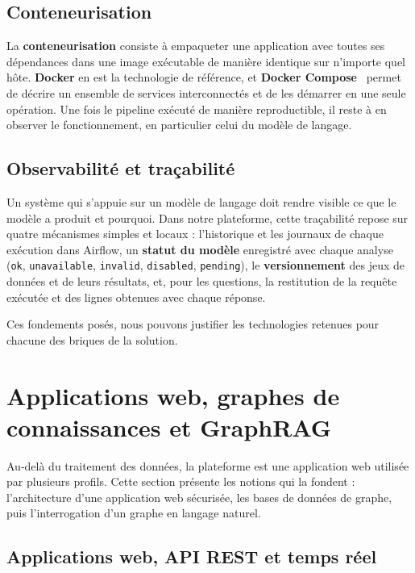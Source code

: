 \subsection{Conteneurisation}

La \textbf{conteneurisation} consiste à empaqueter une application avec toutes ses dépendances dans une image exécutable de manière identique sur n'importe quel hôte. \textbf{Docker} en est la technologie de référence, et \textbf{Docker Compose}~\cite{docker} permet de décrire un ensemble de services interconnectés et de les démarrer en une seule opération. Une fois le pipeline exécuté de manière reproductible, il reste à en observer le fonctionnement, en particulier celui du modèle de langage.

\subsection{Observabilité et traçabilité}

Un système qui s'appuie sur un modèle de langage doit rendre visible ce que le modèle a produit et pourquoi. Dans notre plateforme, cette traçabilité repose sur quatre mécanismes simples et locaux : l'historique et les journaux de chaque exécution dans Airflow, un \textbf{statut du modèle} enregistré avec chaque analyse (\texttt{ok}, \texttt{unavailable}, \texttt{invalid}, \texttt{disabled}, \texttt{pending}), le \textbf{versionnement} des jeux de données et de leurs résultats, et, pour les questions, la restitution de la requête exécutée et des lignes obtenues avec chaque réponse.

Ces fondements posés, nous pouvons justifier les technologies retenues pour chacune des briques de la solution.

\section{Applications web, graphes de connaissances et GraphRAG}

Au-delà du traitement des données, la plateforme est une application web utilisée par plusieurs profils. Cette section présente les notions qui la fondent : l'architecture d'une application web sécurisée, les bases de données de graphe, puis l'interrogation d'un graphe en langage naturel.

\subsection{Applications web, API REST et temps réel}

